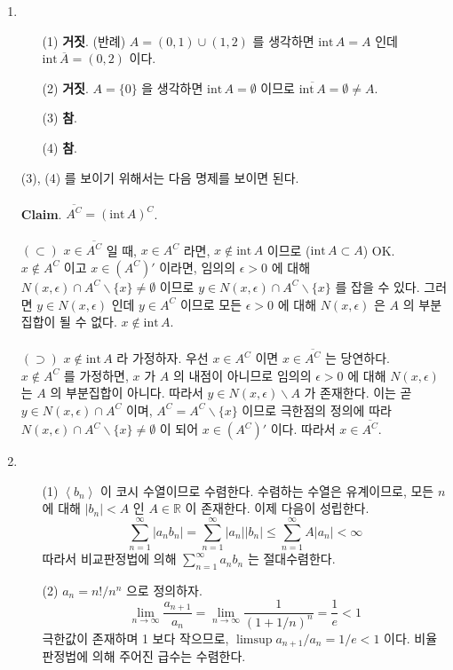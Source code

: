 \documentclass[12pt]{report}
\newcommand{\numl}[1]{\item[\large\textbf{\sffamily #1.}]}
\renewcommand{\span}[1]{\left\langle #1 \right\rangle}
\newcommand{\ra}{\rightarrow}
\newcommand{\abs}[1]{\left|#1\right|}
\newcommand{\inte}{\mathrm{int}\,}
\newcommand{\bs}{\backslash}
\newcommand{\R}{\mathbb{R}}
\begin{document}
\begin{enumerate}
\numl{2}
\begin{enumerate}
	\item[(1)] \textbf{거짓}. (반례) $A = (0, 1)\cup (1, 2)$ 를 생각하면 $\inte A = A$ 인데 $\inte\overline{A} = (0, 2)$ 이다.
	\item[(2)] \textbf{거짓}. $A = \{0\}$ 을 생각하면 $\inte A = \emptyset$ 이므로 $\overline{\inte A} = \emptyset \neq A$.
	\item[(3)] \textbf{참}.
	\item[(4)] \textbf{참}.
\end{enumerate}
(3), (4) 를 보이기 위해서는 다음 명제를 보이면 된다.\\
\\
\textbf{Claim}. $\overline{A^C} = (\inte A)^C$.\\
\\
$(\subset)$ $x\in \overline{A^C}$ 일 때, $x\in A^C$ 라면, $x\notin \inte A$ 이므로 ($\inte A \subset A$) OK.\\
$x\notin A^C$ 이고 $x\in (A^C)'$ 이라면, 임의의 $\epsilon>0$ 에 대해 $N(x, \epsilon) \cap A^C \bs \{x\}\neq \emptyset$ 이므로 $y\in N(x, \epsilon) \cap A^C \bs \{x\}$ 를 잡을 수 있다. 그러면 $y\in N(x, \epsilon)$ 인데 $y\in A^C$ 이므로 모든 $\epsilon>0$ 에 대해 $N(x, \epsilon)$ 은 $A$ 의 부분집합이 될 수 없다. $x\notin \inte A$.\\
\\
$(\supset)$ $x\notin \inte A$ 라 가정하자. 우선 $x\in A^C$ 이면 $x\in \overline{A^C}$ 는 당연하다.\\
$x\notin A^C$ 를 가정하면, $x$ 가 $A$ 의 내점이 아니므로 임의의 $\epsilon>0$ 에 대해 $N(x,\epsilon)$ 는 $A$ 의 부분집합이 아니다. 따라서 $y\in N(x, \epsilon) \bs A$ 가 존재한다. 이는 곧 $y\in N(x, \epsilon) \cap A^C$ 이며, $A^C = A^C \bs \{x\}$ 이므로 극한점의 정의에 따라 $N(x, \epsilon) \cap A^C\bs \{x\} \neq \emptyset$ 이 되어 $x\in (A^C)'$ 이다. 따라서 $x\in \overline{A^C}$.

\numl{3}
\begin{enumerate}
	\item[(1)] $\span{b_n}$ 이 코시 수열이므로 수렴한다. 수렴하는 수열은 유계이므로, 모든 $n$ 에 대해 $\abs{b_n} < A$ 인 $A\in\R$ 이 존재한다. 이제 다음이 성립한다.
	$$\sum_{n=1}^\infty \abs{a_nb_n} = \sum_{n=1}^\infty \abs{a_n}\abs{b_n}\leq \sum_{n=1}^\infty A\abs{a_n} < \infty$$
	따라서 비교판정법에 의해 $\sum_{n=1}^\infty a_nb_n$ 는 절대수렴한다.
	\item[(2)] $a_n = n!/n^n$ 으로 정의하자.
	$$\lim_{n\ra\infty} \frac{a_{n+1}}{a_n} = \lim_{n\ra\infty} \frac{1}{(1+1/n)^n} = \frac{1}{e} < 1$$
	극한값이 존재하며 1 보다 작으므로, $\limsup a_{n+1}/a_n = 1/e < 1$ 이다. 비율판정법에 의해 주어진 급수는 수렴한다.
\end{enumerate}


\end{enumerate}
\end{document}
